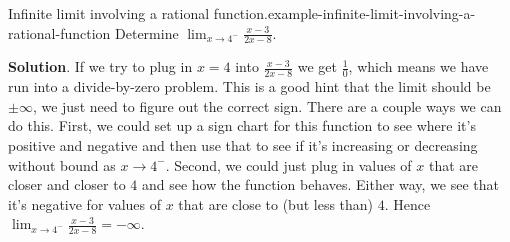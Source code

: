\documentclass[10pt,]{book}
\numberwithin{equation}{section}
\begin{document}
\begin{example}{Infinite limit involving a rational function.}{example-infinite-limit-involving-a-rational-function}%
\hypertarget{p-57}{}%
Determine \(\lim_{x\to4^{-}}\frac{x-3}{2x-8}\).%
\par\smallskip%
\noindent\textbf{Solution}.\hypertarget{solution-11}{}\quad%
\hypertarget{p-58}{}%
If we try to plug in \(x=4\) into \(\frac{x-3}{2x-8}\) we get \(\frac{1}{0}\), which means we have run into a divide-by-zero problem. This is a good hint that the limit should be \(\pm\infty\), we just need to figure out the correct sign. There are a couple ways we can do this. First, we could set up a sign chart for this function to see where it's positive and negative and then use that to see if it's increasing or decreasing without bound as \(x\to4^{-}\). Second, we could just plug in values of \(x\) that are closer and closer to \(4\) and see how the function behaves. Either way, we see that it's negative for values of \(x\) that are close to (but less than) \(4\). Hence \(\lim_{x\to4^{-}}\frac{x-3}{2x-8}=-\infty\).%
\end{example}
%
%
\typeout{************************************************}
\typeout{************************************************}
%
\end{document}
